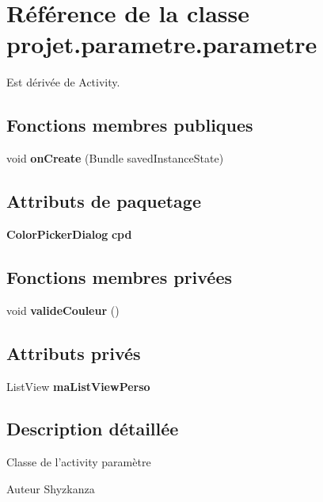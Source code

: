 \section{\-Référence de la classe projet.\-parametre.\-parametre}
\label{classprojet_1_1parametre_1_1parametre}


\-Est dérivée de \-Activity.

\subsection*{\-Fonctions membres publiques}
\begin{DoxyCompactItemize}
\item 
void {\bf on\-Create} (\-Bundle saved\-Instance\-State)
\end{DoxyCompactItemize}
\subsection*{\-Attributs de paquetage}
\begin{DoxyCompactItemize}
\item 
{\bf \-Color\-Picker\-Dialog} {\bf cpd}
\end{DoxyCompactItemize}
\subsection*{\-Fonctions membres privées}
\begin{DoxyCompactItemize}
\item 
void {\bf valide\-Couleur} ()
\end{DoxyCompactItemize}
\subsection*{\-Attributs privés}
\begin{DoxyCompactItemize}
\item 
\-List\-View {\bf ma\-List\-View\-Perso}
\end{DoxyCompactItemize}


\subsection{\-Description détaillée}
\-Classe de l'activity paramètre

\begin{DoxyAuthor}{\-Auteur}
\-Shyzkanza 
\end{DoxyAuthor}


